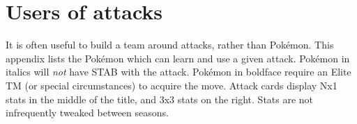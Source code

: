 \chapter{Users of attacks\label{chap:attackemployers}}
It is often useful to build a team around attacks, rather than Pokémon.
This appendix lists the Pokémon which can learn and use a given attack.
Pokémon in italics will \textit{not} have STAB with the attack.
Pokémon in boldface require an Elite TM (or special circumstances) to acquire the move.
Attack cards display Nx1 stats in the middle of the title, and 3x3 stats on the right.
Stats are not infrequently tweaked between seasons.
